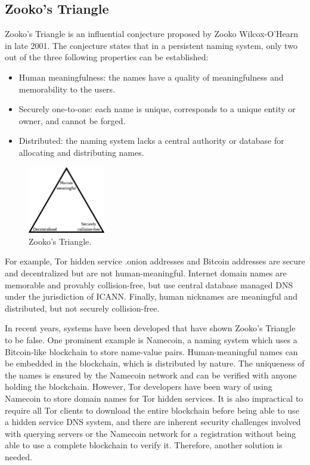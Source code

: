 \documentclass[journal]{IEEEtran}
\begin{document}
\subsection{Zooko's Triangle}

Zooko's Triangle is an influential conjecture proposed by Zooko Wilcox-O'Hearn in late 2001. The conjecture states that in a persistent naming system, only two out of the three following properties can be established:\cite{Ferdous2009}

\begin{itemize}
  \item Human meaningfulness: the names have a quality of meaningfulness and memorability to the users. 
  \item Securely one-to-one: each name is unique, corresponds to a unique entity or owner, and cannot be forged.
  \item Distributed: the naming system lacks a central authority or database for allocating and distributing names.
\end{itemize}

\begin{figure}[htbp]
	\centering
	\includegraphics[width=0.3\textwidth]{../images/Zooko.eps}
	\caption{Zooko's Triangle.}
	\label{fig:figure8}
\end{figure}

For example, Tor hidden service .onion addresses and Bitcoin addresses are secure and decentralized but are not human-meaningful. Internet domain names are memorable and provably collision-free, but use central database managed DNS under the jurisdiction of ICANN. Finally, human nicknames are meaningful and distributed, but not securely collision-free.\cite{Stiegler2005}

In recent years, systems have been developed that have shown Zooko's Triangle to be false. One prominent example is Namecoin, a naming system which uses a Bitcoin-like blockchain to store name-value pairs. Human-meaningful names can be embedded in the blockchain, which is distributed by nature. The uniqueness of the names is ensured by the Namecoin network and can be verified with anyone holding the blockchain. However, Tor developers have been wary of using Namecoin to store domain names for Tor hidden services. It is also impractical to require all Tor clients to download the entire blockchain before being able to use a hidden service DNS system, and there are inherent security challenges involved with querying servers or the Namecoin network for a registration without being able to use a complete blockchain to verify it. Therefore, another solution is needed.
\end{document}
